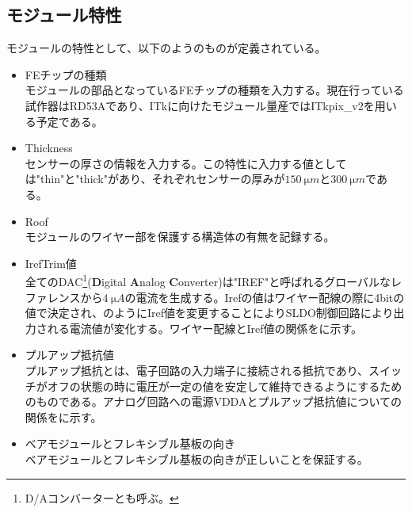 \subsection{モジュール特性}
\label{sec:module-prop}
モジュールの特性として、以下のようのものが定義されている。
\begin{itemize}
  \item FEチップの種類 \\
  モジュールの部品となっているFEチップの種類を入力する。現在行っている試作器はRD53Aであり、ITkに向けたモジュール量産ではITkpix\_v2を用いる予定である。
  \item Thickness \\
  センサーの厚さの情報を入力する。この特性に入力する値としては"thin"と"thick"があり、それぞれセンサーの厚みが$150\ \si{\micro m}$と$300\ \si{\micro m}$である。
  \item Roof \\
  モジュールのワイヤー部を保護する構造体の有無を記録する。
  \item IrefTrim値\\
  全てのDAC\footnote{D/Aコンバーターとも呼ぶ。}(\textbf{D}igital \textbf{A}nalog \textbf{C}onverter)は"IREF"と呼ばれるグローバルなレファレンスから$4\ \si{\micro A}$の電流を生成する。Irefの値はワイヤー配線の際に4bitの値で決定され、のようにIref値を変更することによりSLDO制御回路により出力される電流値が変化する。ワイヤー配線とIref値の関係をに示す。
  \item プルアップ抵抗値\\
  プルアップ抵抗とは、電子回路の入力端子に接続される抵抗であり、スイッチがオフの状態の時に電圧が一定の値を安定して維持できるようにするためのものである。アナログ回路への電源VDDAとプルアップ抵抗値についての関係をに示す。
  \item ベアモジュールとフレキシブル基板の向き \\
  ベアモジュールとフレキシブル基板の向きが正しいことを保証する。
\end{itemize}

